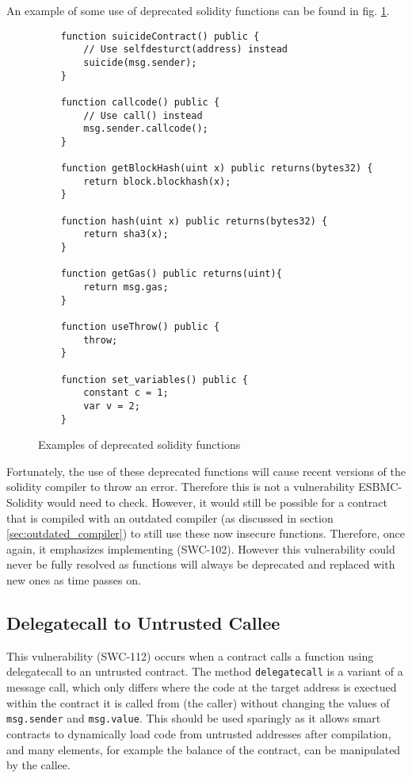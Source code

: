 An example of some use of deprecated solidity functions can be found in fig. \ref{fig:deprecated_solidity_functions}. 

\begin{figure}
\begin{lstlisting}
    function suicideContract() public {
        // Use selfdesturct(address) instead
        suicide(msg.sender);
    }

    function callcode() public {
        // Use call() instead
        msg.sender.callcode();
    }

    function getBlockHash(uint x) public returns(bytes32) {
        return block.blockhash(x);
    }

    function hash(uint x) public returns(bytes32) {
        return sha3(x);
    }

    function getGas() public returns(uint){
        return msg.gas;
    }

    function useThrow() public {
        throw;
    }

    function set_variables() public {
        constant c = 1;
        var v = 2;
    }
\end{lstlisting}
\caption{Examples of deprecated solidity functions}
\label{fig:deprecated_solidity_functions}
\end{figure}

Fortunately, the use of these deprecated functions will cause recent versions of the solidity compiler to throw an error. Therefore this is not a vulnerability ESBMC-Solidity would need to check. However, it would still be possible for a contract that is compiled with an outdated compiler (as discussed in section \ref{sec:outdated_compiler}) to still use these now insecure functions. Therefore, once again, it emphasizes implementing (SWC-102). However this vulnerability could never be fully resolved as functions will always be deprecated and replaced with new ones as time passes on.

\subsection{Delegatecall to Untrusted Callee}
\label{sec:delegatecall_to_untrusted_callee}

This vulnerability (SWC-112) occurs when a contract calls a function using delegatecall to an untrusted contract. The method \verb|delegatecall| is a variant of a message call, which only differs where the code at the target address is exectued within the contract it is called from (the caller) without changing the values of \verb|msg.sender| and \verb|msg.value|. This should be used sparingly as it allows smart contracts to dynamically load code from untrusted addresses after compilation, and many elements, for example the balance of the contract, can be manipulated by the callee. 

